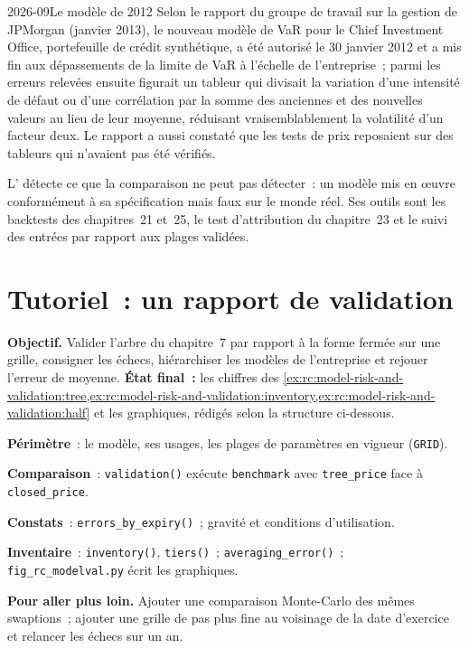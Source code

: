 \begin{dated}{2026-09}{Le modèle de 2012}\label{dat:rc:model-risk-and-validation:cio}
Selon le rapport du groupe de travail sur la gestion de JPMorgan (janvier 2013), le nouveau modèle de VaR pour le Chief
Investment Office, portefeuille de crédit synthétique, a été autorisé le 30 janvier 2012 et a mis fin aux dépassements
de la limite de VaR à l'échelle de l'entreprise~; parmi les erreurs relevées ensuite figurait un tableur qui divisait la
variation d'une intensité de défaut ou d'une corrélation par la somme des anciennes et des nouvelles valeurs au lieu de leur moyenne,
réduisant vraisemblablement la volatilité d'un facteur deux. Le rapport a aussi constaté que les tests de prix reposaient sur
des tableurs qui n'avaient pas été vérifiés.
\end{dated}

L' détecte ce que la comparaison ne peut pas détecter~: un modèle mis en œuvre conformément à sa spécification mais
faux sur le monde réel. Ses outils sont les backtests des chapitres~21 et~25, le test d'attribution du
chapitre~23 et le suivi des entrées par rapport aux plages validées.

\section{Tutoriel~: un rapport de validation}\label{tut:rc:model-risk-and-validation:tutorial}

\begin{tutorial}
\textbf{Objectif.} Valider l'arbre du chapitre~7 par rapport à la forme fermée sur une grille, consigner les échecs,
hiérarchiser les modèles de l'entreprise et rejouer l'erreur de moyenne. \textbf{État final~:} les chiffres des
\cref{ex:rc:model-risk-and-validation:tree,ex:rc:model-risk-and-validation:inventory,ex:rc:model-risk-and-validation:half}
et les graphiques, rédigés selon la structure ci-dessous.
\begin{tutsteps}
\item \textbf{Périmètre}~: le modèle, ses usages, les plages de paramètres en vigueur (\texttt{GRID}).
\item \textbf{Comparaison}~: \texttt{validation()} exécute \texttt{benchmark} avec \texttt{tree\_price} face à \texttt{closed\_price}.
\item \textbf{Constats}~: \texttt{errors\_by\_expiry()}~; gravité et conditions d'utilisation.
\item \textbf{Inventaire}~: \texttt{inventory()}, \texttt{tiers()}~; \texttt{averaging\_error()}~;
\texttt{fig\_rc\_modelval.py} écrit les graphiques.
\end{tutsteps}
\textbf{Pour aller plus loin.} Ajouter une comparaison Monte-Carlo des mêmes swaptions~; ajouter une grille de pas plus fine
au voisinage de la date d'exercice et relancer les échecs sur un an.
\end{tutorial}

